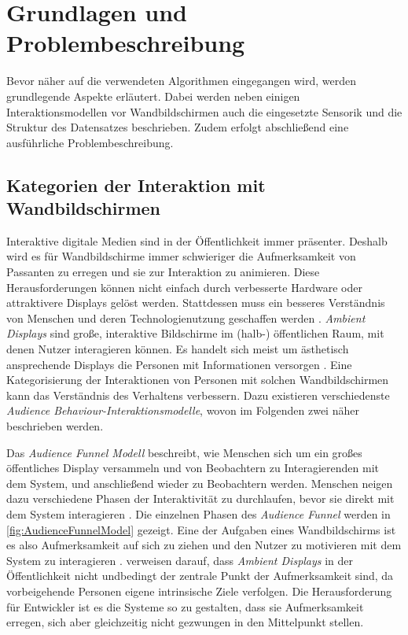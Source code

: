 \chapter{Grundlagen und Problembeschreibung}
\label{chapter2}
Bevor näher auf die verwendeten Algorithmen eingegangen wird,
werden grundlegende Aspekte erläutert.
Dabei werden neben einigen Interaktionsmodellen vor Wandbildschirmen
auch die eingesetzte Sensorik und die Struktur des Datensatzes beschrieben.
Zudem erfolgt abschließend eine ausführliche Problembeschreibung.


\section{Kategorien der Interaktion mit Wandbildschirmen}
\label{2-KategorienInteraktion-Wandbildschirme}
Interaktive digitale Medien sind in der Öffentlichkeit immer präsenter.
Deshalb wird es für Wandbildschirme immer schwieriger die Aufmerksamkeit von Passanten zu erregen
und sie zur Interaktion zu animieren.
Diese Herausforderungen können nicht einfach durch verbesserte Hardware oder attraktivere Displays gelöst werden.
Stattdessen muss ein besseres Verständnis von Menschen und deren Technologienutzung geschaffen werden \citep{wouters_uncovering_2016}.
\emph{Ambient Displays} sind große, interaktive Bildschirme im (halb-) öffentlichen Raum, mit denen Nutzer interagieren können.
Es handelt sich meist um ästhetisch ansprechende Displays die Personen mit Informationen versorgen \citep{mankoff_heuristic_2003}.
Eine Kategorisierung der Interaktionen von Personen mit solchen Wandbildschirmen kann das Verständnis des Verhaltens verbessern.
Dazu existieren verschiedenste \emph{Audience Behaviour-Interaktionsmodelle}, wovon im Folgenden zwei näher beschrieben werden.

Das \emph{Audience Funnel Modell} beschreibt, wie Menschen sich um ein großes öffentliches Display versammeln
und von Beobachtern zu Interagierenden mit dem System, und anschließend wieder zu Beobachtern werden.
Menschen neigen dazu verschiedene Phasen der Interaktivität zu durchlaufen,
bevor sie direkt mit dem System interagieren \citep{wouters_uncovering_2016, mai_audience_2018}.
Die einzelnen Phasen des \emph{Audience Funnel} werden in \autoref{fig:AudienceFunnelModel} gezeigt.
Eine der Aufgaben eines Wandbildschirms ist es also Aufmerksamkeit auf sich zu ziehen
und den Nutzer zu motivieren mit dem System zu interagieren \citep{mai_audience_2018}.
\citet{mai_audience_2018} verweisen darauf, dass \emph{Ambient Displays} in der Öffentlichkeit
nicht undbedingt der zentrale Punkt der Aufmerksamkeit sind, da vorbeigehende Personen eigene intrinsische Ziele verfolgen.
Die Herausforderung für Entwickler ist es die Systeme so zu gestalten,
dass sie Aufmerksamkeit erregen, sich aber gleichzeitig nicht gezwungen in den Mittelpunkt stellen.

